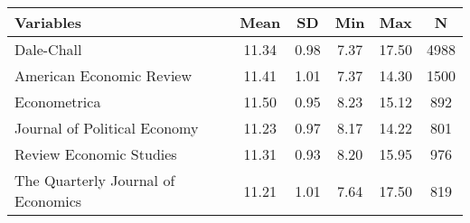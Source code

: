 \begin{tabular}{lccccc}
\toprule
                                     Variables &  Mean &   SD &  Min &   Max &    N \\
\midrule
                                    Dale-Chall & 11.34 & 0.98 & 7.37 & 17.50 & 4988 \\
          \hspace{3mm}American Economic Review & 11.41 & 1.01 & 7.37 & 14.30 & 1500 \\
                      \hspace{3mm}Econometrica & 11.50 & 0.95 & 8.23 & 15.12 &  892 \\
      \hspace{3mm}Journal of Political Economy & 11.23 & 0.97 & 8.17 & 14.22 &  801 \\
           \hspace{3mm}Review Economic Studies & 11.31 & 0.93 & 8.20 & 15.95 &  976 \\
\hspace{3mm}The Quarterly Journal of Economics & 11.21 & 1.01 & 7.64 & 17.50 &  819 \\
\bottomrule
\end{tabular}
